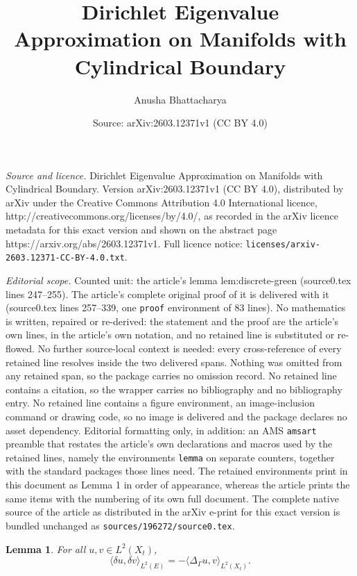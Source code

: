 \documentclass[10pt,a4paper]{amsart}
\title{Dirichlet Eigenvalue Approximation on Manifolds with Cylindrical Boundary}
\author{Anusha Bhattacharya}
\date{Source: arXiv:2603.12371v1 (CC BY 4.0)}
\newtheorem{lemma}{Lemma}
\begin{document}
\maketitle

\noindent\emph{Source and licence.} Dirichlet Eigenvalue Approximation on Manifolds with Cylindrical Boundary. Version arXiv:2603.12371v1 (CC BY 4.0), distributed by arXiv under the Creative Commons Attribution 4.0 International licence, http://creativecommons.org/licenses/by/4.0/, as recorded in the arXiv licence metadata for this exact version and shown on the abstract page https://arxiv.org/abs/2603.12371v1. Full licence notice: \texttt{licenses/arxiv-2603.12371-CC-BY-4.0.txt}.\par\smallskip

\noindent\textit{Editorial scope.} Counted unit: the article's lemma lem:discrete-green (source0.tex lines 247--255). The article's complete original proof of it is delivered with it (source0.tex lines 257--339, one \texttt{proof} environment of 83 lines). No mathematics is written, repaired or re-derived: the statement and the proof are the article's own lines, in the article's own notation, and no retained line is substituted or re-flowed.  No further source-local context is needed: every cross-reference of every retained line resolves inside the two delivered spans.  Nothing was omitted from any retained span, so the package carries no omission record.  No retained line contains a citation, so the wrapper carries no bibliography and no bibliography entry.  No retained line contains a figure environment, an image-inclusion command or drawing code, so no image is delivered and the package declares no asset dependency.  Editorial formatting only, in addition: an AMS \texttt{amsart} preamble that restates the article's own declarations and macros used by the retained lines, namely the environments \texttt{lemma} on separate counters, together with the standard packages those lines need.  The retained environments print in this document as Lemma 1 in order of appearance, whereas the article prints the same items with the numbering of its own full document.  The complete native source of the article as distributed in the arXiv e-print for this exact version is bundled unchanged as \texttt{sources/196272/source0.tex}.
\begin{lemma}
\label{lem:discrete-green}
For all $u,v \in L^2(X_t)$,
\[
\langle \delta u, \delta v \rangle_{L^2(E)}
=
-\langle \Delta_\Gamma u, v \rangle_{L^2(X_t)} .
\]
\end{lemma}
\end{document}
